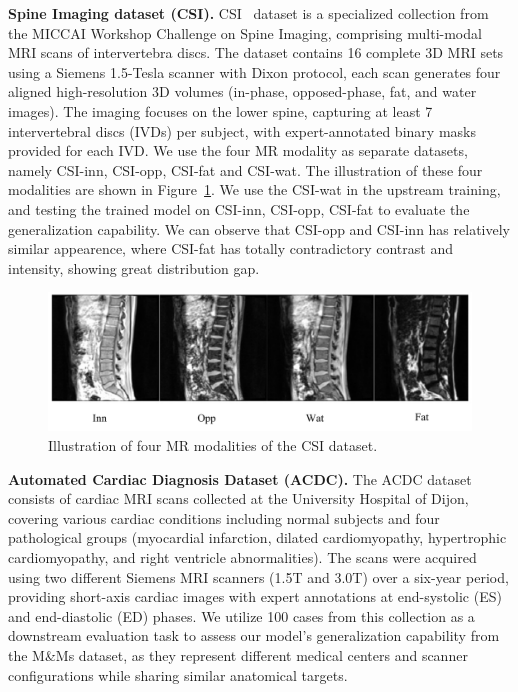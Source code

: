\noindent\textbf{Spine Imaging dataset (CSI).} CSI~\cite{ivdm3seg} dataset is a specialized collection from the MICCAI Workshop Challenge on Spine Imaging, comprising multi-modal MRI scans of intervertebra discs. The dataset contains 16 complete 3D MRI sets using a Siemens 1.5-Tesla scanner with Dixon protocol, each scan generates four aligned high-resolution 3D volumes (in-phase, opposed-phase, fat, and water images). The imaging focuses on the lower spine, capturing at least 7 intervertebral discs (IVDs) per subject, with expert-annotated binary masks provided for each IVD. We use the four MR modality as separate datasets, namely CSI-inn, CSI-opp, CSI-fat and CSI-wat. The illustration of these four modalities are shown in Figure~\ref{fig:supp_csi}.  We use the CSI-wat in the upstream training, and testing the trained model on CSI-inn, CSI-opp, CSI-fat to evaluate the generalization capability. We can observe that CSI-opp and CSI-inn has relatively similar appearence, where CSI-fat has totally contradictory contrast and intensity, showing great distribution gap.


\begin{figure}[ht]
\begin{center}
\includegraphics[width=\columnwidth]{./fig/supp_csi.pdf}
\end{center}
\vspace{-1em}
\caption{Illustration of four MR modalities of the CSI dataset.}
\label{fig:supp_csi}
\vspace{-1em}
\end{figure}


\noindent\textbf{Automated Cardiac Diagnosis Dataset (ACDC).} The ACDC dataset~\cite{bernard2018deep} consists of cardiac MRI scans collected at the University Hospital of Dijon, covering various cardiac conditions including normal subjects and four pathological groups (myocardial infarction, dilated cardiomyopathy, hypertrophic cardiomyopathy, and right ventricle abnormalities). The scans were acquired using two different Siemens MRI scanners (1.5T and 3.0T) over a six-year period, providing short-axis cardiac images with expert annotations at end-systolic (ES) and end-diastolic (ED) phases. We utilize 100 cases from this collection as a downstream evaluation task to assess our model's generalization capability from the M\&Ms dataset, as they represent different medical centers and scanner configurations while sharing similar anatomical targets.




